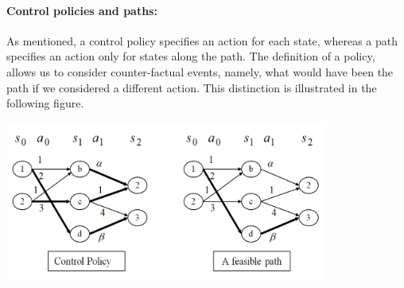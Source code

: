 %

\paragraph{Control policies and paths:}
As mentioned, a control policy specifies an action for each state,
whereas a path specifies an action only for states along the path.
The definition of a policy, allows us to consider counter-factual
events, namely, what would have been the path if we considered a
different action. This distinction is illustrated in the following
figure.

\begin{centering}
\includegraphics[width=0.8\textwidth]{figures/lecture2_policy_path}\\
\end{centering}

